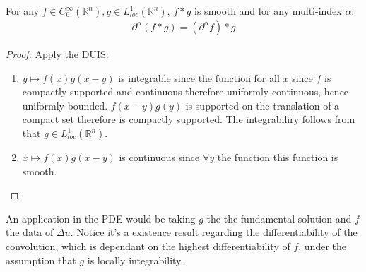 \begin{theorem}
	For any $f \in C_0^\infty(\mathbb{R}^n), g \in L^1_{loc}(\mathbb{R}^n)$, $f*g$ is smooth and for any multi-index $\alpha$:
	\begin{align*}
		\partial^\alpha(f*g) = (\partial^\alpha f) * g
	\end{align*}
\end{theorem}
\begin{proof}
	Apply the DUIS:
	\begin{enumerate}
		\item $y \mapsto f(x)g(x-y)$ is integrable since the function for all $x$ since $f$ is compactly supported and continuous therefore uniformly continuous, hence uniformly bounded. $f(x - y)g(y)$ is supported on the translation of a compact set therefore is compactly supported. The integrabiliry follows from that $g \in L_{loc}^1(\mathbb{R}^n)$. 
		\item $x \mapsto f(x)g(x-y)$ is continuous since $\forall y$ the function this function is smooth. 
	\end{enumerate}
\end{proof}
\begin{remark}
An application in the PDE would be taking $g$ the the fundamental solution and $f$ the data of $\Delta u$.	Notice it's a existence result regarding the differentiability of the convolution, which is dependant on the highest differentiability of $f$, under the assumption that $g$ is locally integrability.
\end{remark}
	

